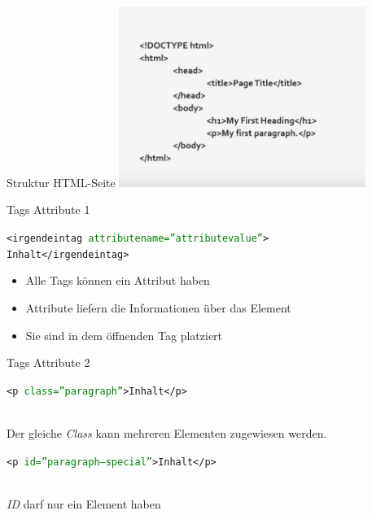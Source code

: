 \documentclass[12pt,xcolor={rgb}]{beamer}
\begin{document}
\begin{frame}{Struktur HTML-Seite}
\includegraphics[width=8cm]{imgs/struk_html.jpg}
\end{frame}



\begin{frame}{Tags Attribute 1}
\begin{large}  
{\texttt{<irgendeintag \textcolor{green}{attributename=''attributevalue''}>\\Inhalt</irgendeintag>}}\\
\end{large}
\begin{itemize}
\item Alle Tags können ein Attribut haben
\item Attribute liefern die Informationen über das Element
\item Sie sind in dem öffnenden Tag platziert
\end{itemize}
\end{frame}

\begin{frame}{Tags Attribute 2}
\begin{large}  
\texttt{<p \textcolor{green}{class=''paragraph''}>Inhalt</p>}
\end{large}
\\
\footnotesize{Der gleiche \textit{Class} kann mehreren Elementen zugewiesen werden.}\\
\vspace{0.5cm}
\begin{large}  
\texttt{<p \textcolor{green}{id=''paragraph--special''}>Inhalt</p>}
\end{large}\\
\footnotesize{\textit{ID} darf nur ein Element haben}
\end{frame}
\end{document}
